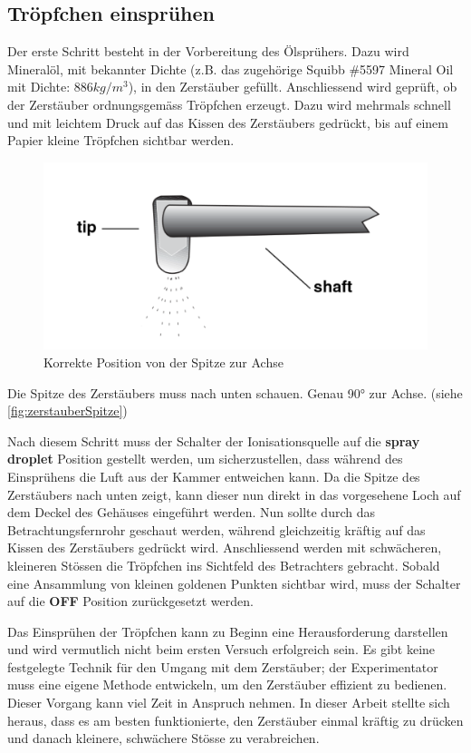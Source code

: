 \subsection{Tröpfchen einsprühen}\label{sub:tröpfchensprühen}
Der erste Schritt besteht in der Vorbereitung des Ölsprühers. Dazu wird Mineralöl, mit bekannter Dichte (z.B. das zugehörige Squibb \#5597 Mineral Oil mit Dichte: $886 kg/m^3$), in den Zerstäuber gefüllt. Anschliessend wird geprüft, ob der Zerstäuber ordnungsgemäss Tröpfchen erzeugt. Dazu wird mehrmals schnell und mit leichtem Druck auf das Kissen des Zerstäubers gedrückt, bis auf einem Papier kleine Tröpfchen sichtbar werden.
\begin{figure}[h]
		\centering
		\includegraphics[scale=0.25]{bilder/pdf/zerstauberSpitze.pdf}
		\caption{Korrekte Position von der Spitze zur Achse \parencite[7]{instructionManualHalogen}}
		\label{fig:zerstauberSpitze}
\end{figure}

\noindent Die Spitze des Zerstäubers muss nach unten schauen. Genau 90° zur Achse. (siehe \autoref{fig:zerstauberSpitze})

Nach diesem Schritt muss der Schalter der Ionisationsquelle auf die \textbf{spray droplet} Position gestellt werden, um sicherzustellen, dass während des Einsprühens die Luft aus der Kammer entweichen kann. Da die Spitze des Zerstäubers nach unten zeigt, kann dieser nun direkt in das vorgesehene Loch auf dem Deckel des Gehäuses eingeführt werden. Nun sollte durch das Betrachtungsfernrohr geschaut werden, während gleichzeitig kräftig auf das Kissen des Zerstäubers gedrückt wird. Anschliessend werden mit schwächeren, kleineren Stössen die Tröpfchen ins Sichtfeld des Betrachters gebracht. Sobald eine Ansammlung von kleinen goldenen Punkten sichtbar wird, muss der Schalter auf die \textbf{OFF} Position zurückgesetzt werden.

Das Einsprühen der Tröpfchen kann zu Beginn eine Herausforderung darstellen und wird vermutlich nicht beim ersten Versuch erfolgreich sein. Es gibt keine festgelegte Technik für den Umgang mit dem Zerstäuber; der Experimentator muss eine eigene Methode entwickeln, um den Zerstäuber effizient zu bedienen. Dieser Vorgang kann viel Zeit in Anspruch nehmen. In dieser Arbeit stellte sich heraus, dass es am besten funktionierte, den Zerstäuber einmal kräftig zu drücken und danach kleinere, schwächere Stösse zu verabreichen.


